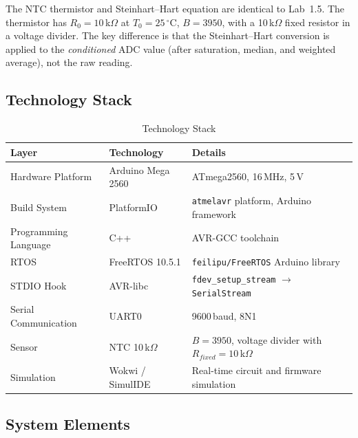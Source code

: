 \documentclass[12pt]{article}
\begin{document}
The NTC thermistor and Steinhart--Hart equation are identical to Lab~1.5. The thermistor has $R_0 = 10$\,k$\Omega$ at $T_0 = 25\,^{\circ}$C, $B = 3950$, with a 10\,k$\Omega$ fixed resistor in a voltage divider. The key difference is that the Steinhart--Hart conversion is applied to the \emph{conditioned} ADC value (after saturation, median, and weighted average), not the raw reading.

\subsection{Technology Stack}

\begin{table}[H]
\centering
\begin{tabular}{@{}lll@{}}
\toprule
\textbf{Layer} & \textbf{Technology} & \textbf{Details} \\
\midrule
Hardware Platform    & Arduino Mega 2560  & ATmega2560, 16\,MHz, 5\,V \\
Build System         & PlatformIO         & \texttt{atmelavr} platform, Arduino framework \\
Programming Language & C++                & AVR-GCC toolchain \\
RTOS                 & FreeRTOS 10.5.1    & \texttt{feilipu/FreeRTOS} Arduino library \\
STDIO Hook           & AVR-libc           & \texttt{fdev\_setup\_stream} $\to$ \texttt{SerialStream} \\
Serial Communication & UART0              & 9600\,baud, 8N1 \\
Sensor               & NTC 10\,k$\Omega$  & $B = 3950$, voltage divider with $R_{fixed} = 10$\,k$\Omega$ \\
Simulation           & Wokwi / SimulIDE   & Real-time circuit and firmware simulation \\
\bottomrule
\end{tabular}
\caption{Technology Stack}
\label{tab:techstack}
\end{table}

\subsection{System Elements}
\end{document}
